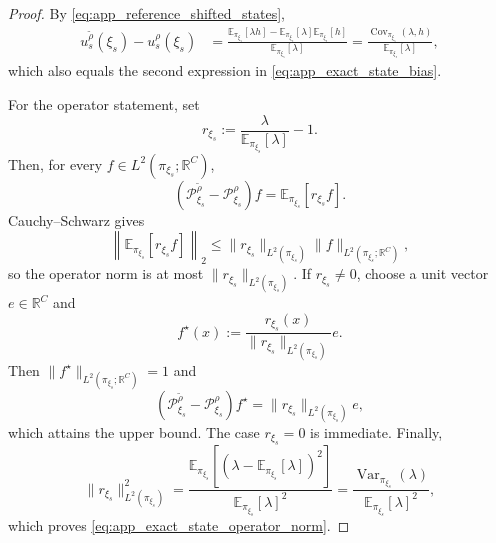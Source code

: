 \begin{proof}
By \eqref{eq:app_reference_shifted_states},
\begin{align}
    u_s^{\widetilde{\rho}}(\xi_s)-u_s^{\rho}(\xi_s)
    &=\frac{\mathbb{E}_{\pi_{\xi_s}}[\lambda h]
    -\mathbb{E}_{\pi_{\xi_s}}[\lambda]
    \mathbb{E}_{\pi_{\xi_s}}[h]}
    {\mathbb{E}_{\pi_{\xi_s}}[\lambda]}
    =\frac{\operatorname{Cov}_{\pi_{\xi_s}}(\lambda,h)}
    {\mathbb{E}_{\pi_{\xi_s}}[\lambda]},
    \label{eq:app_state_bias_proof_cov}
\end{align}
which also equals the second expression in \eqref{eq:app_exact_state_bias}.

For the operator statement, set
\begin{equation}
    r_{\xi_s}:=\frac{\lambda}
    {\mathbb{E}_{\pi_{\xi_s}}[\lambda]}-1.
    \label{eq:app_centered_density_ratio}
\end{equation}
Then, for every $f\in L^2(\pi_{\xi_s};\mathbb{R}^{C})$,
\begin{equation}
    \left(\mathcal{P}_{\xi_s}^{\widetilde{\rho}}
    -\mathcal{P}_{\xi_s}^{\rho}\right)f
    =\mathbb{E}_{\pi_{\xi_s}}[r_{\xi_s}f].
    \label{eq:app_state_operator_difference}
\end{equation}
Cauchy--Schwarz gives
\begin{equation}
    \left\|\mathbb{E}_{\pi_{\xi_s}}[r_{\xi_s}f]\right\|_2
    \leq \|r_{\xi_s}\|_{L^2(\pi_{\xi_s})}
    \|f\|_{L^2(\pi_{\xi_s};\mathbb{R}^{C})},
    \label{eq:app_state_operator_upper}
\end{equation}
so the operator norm is at most $\|r_{\xi_s}\|_{L^2(\pi_{\xi_s})}$. If $r_{\xi_s}\neq0$, choose a unit vector $e\in\mathbb{R}^{C}$ and
\begin{equation}
    f^{\star}(x)
    :=\frac{r_{\xi_s}(x)}
    {\|r_{\xi_s}\|_{L^2(\pi_{\xi_s})}}e.
    \label{eq:app_state_operator_extremizer}
\end{equation}
Then $\|f^{\star}\|_{L^2(\pi_{\xi_s};\mathbb{R}^{C})}=1$ and
\begin{equation}
    \left(\mathcal{P}_{\xi_s}^{\widetilde{\rho}}
    -\mathcal{P}_{\xi_s}^{\rho}\right)f^{\star}
    =\|r_{\xi_s}\|_{L^2(\pi_{\xi_s})}e,
    \label{eq:app_state_operator_attainment}
\end{equation}
which attains the upper bound. The case $r_{\xi_s}=0$ is immediate. Finally,
\begin{equation}
    \|r_{\xi_s}\|_{L^2(\pi_{\xi_s})}^2
    =\frac{\mathbb{E}_{\pi_{\xi_s}}\!\left[
    (\lambda-\mathbb{E}_{\pi_{\xi_s}}[\lambda])^2\right]}
    {\mathbb{E}_{\pi_{\xi_s}}[\lambda]^2}
    =\frac{\operatorname{Var}_{\pi_{\xi_s}}(\lambda)}
    {\mathbb{E}_{\pi_{\xi_s}}[\lambda]^2},
    \label{eq:app_state_operator_variance}
\end{equation}
which proves \eqref{eq:app_exact_state_operator_norm}.
\end{proof}

